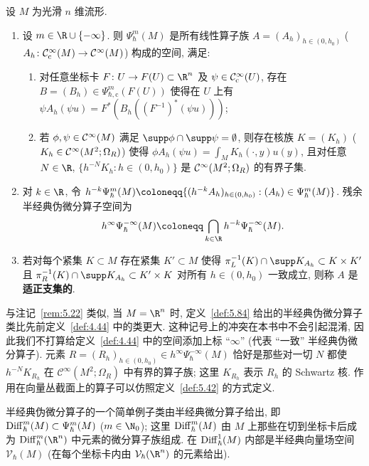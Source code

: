 \begin{definition}[流形上的半经典伪微分算子]\label{def:5.84}
设 $M$ 为光滑 $n$ 维流形.
\begin{enumerate}
    \item 设 $m \in \R \cup \{-\infty\}$. 则 $\Psi_\hbar^m(M)$ 是所有线性算子族 $A = (A_h)_{h \in (0, h_0)}$ ($A_h \colon \mathcal{C}_{\mathrm{c}}^\infty(M) \to \mathcal{C}^\infty(M)$) 构成的空间, 满足:
    \begin{enumerate}
        \item 对任意坐标卡 $F \colon U \to F(U) \subset \R^n$ 及 $\psi \in \mathcal{C}_{\mathrm{c}}^\infty(U)$, 存在 $B = (B_h) \in \Psi_{\hbar,\mathrm{c}}^m(F(U))$ 使得在 $U$ 上有 $\psi A_h(\psi u) = F^* (B_h ((F^{-1})^*(\psi u)))$;
        \item 若 $\phi, \psi \in \mathcal{C}^\infty(M)$ 满足 $\supp\phi \cap \supp\psi = \emptyset$, 则存在核族 $K = (K_h)$ ($K_h \in \mathcal{C}^\infty(M^2; \Omega_R)$) 使得 $\phi A_h(\psi u) = \int_M K_h(\cdot, y) u(y)$, 且对任意 $N \in \R$, $\{h^{-N} K_h : h \in (0, h_0)\}$ 是 $\mathcal{C}^\infty(M^2; \Omega_R)$ 的有界子集.
    \end{enumerate}
    \item 对 $k \in \R$, 令 $h^{-k} \Psi_\hbar^m(M) \defeq \{(h^{-k} A_h)_{h\in(0, h_0)} : (A_h) \in \Psi_\hbar^m(M)\}$. 残余半经典伪微分算子空间为
    \begin{equation}\label{eq:5.196}
        h^\infty \Psi_\hbar^{-\infty}(M) \defeq \bigcap_{k \in \R} h^{-k} \Psi_\hbar^{-\infty}(M).
    \end{equation}
    \item 若对每个紧集 $K \subset M$ 存在紧集 $K' \subset M$ 使得 $\pi_L^{-1}(K) \cap \supp K_{A_h} \subset K \times K'$ 且 $\pi_R^{-1}(K) \cap \supp K_{A_h} \subset K' \times K$ 对所有 $h \in (0, h_0)$ 一致成立, 则称 $A$ 是\textbf{适正支集的}.
\end{enumerate}
\end{definition}

与注记~\ref{rem:5.22} 类似, 当 $M = \R^n$ 时, 定义~\ref{def:5.84} 给出的半经典伪微分算子类比先前定义~\ref{def:4.44} 中的类更大. 这种记号上的冲突在本书中不会引起混淆, 因此我们不打算给定义~\ref{def:4.44} 中的空间添加上标 ``$\infty$'' (代表 ``一致'' 半经典伪微分算子). 元素 $R = (R_h)_{h \in (0, h_0)} \in h^\infty \Psi_\hbar^{-\infty}(M)$ 恰好是那些对一切 $N$ 都使 $h^{-N} K_{R_h}$ 在 $\mathcal{C}^\infty(M^2; \Omega_R)$ 中有界的算子族; 这里 $K_{R_h}$ 表示 $R_h$ 的 Schwartz 核. 作用在向量丛截面上的算子可以仿照定义~\ref{def:5.42} 的方式定义.

半经典伪微分算子的一个简单例子类由半经典微分算子给出, 即 $\operatorname{Diff}_\hbar^m(M) \subset \Psi_\hbar^m(M)$ ($m \in \N_0$); 这里 $\operatorname{Diff}_\hbar^m(M)$ 由 $M$ 上那些在切到坐标卡后成为 $\Diff_\hbar^m(\R^n)$ 中元素的微分算子族组成. 在 $\operatorname{Diff}_\hbar^1(M)$ 内部是半经典向量场空间 $\mathcal{V}_\hbar(M)$ (在每个坐标卡内由 $\mathcal{V}_\hbar(\R^n)$ 的元素给出).

